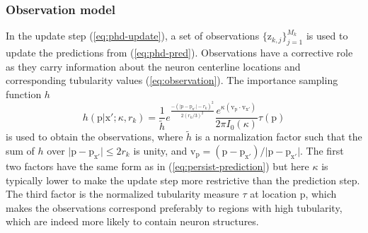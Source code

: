 \subsubsection{Observation model}
\label{sssec:observation-model}
In the update step (\ref{eq:phd-update}), a set of observations $\{\mathrm{z}_{k,j}\}_{j=1}^{M_k}$ is used to update the predictions from (\ref{eq:phd-pred}). Observations have a corrective role as they carry information about the neuron centerline locations and corresponding tubularity values (\ref{eq:observation}). The importance sampling function $h$
\begin{equation}
\label{eq:observation-importance-sampling}
h(\mathrm{p} | \mathrm{x'}; \kappa, r_k) = \frac{1}{\tilde{h}} e^{\frac{ -(\vert \mathrm{p} - \mathrm{p}_{\mathrm{x'}}  \vert - r_k)^2  }{2 (r_k/3)^2}} \frac{e^{\kappa (\mathrm{v}_{\mathrm{p}} \cdot \mathrm{v}_{\mathrm{x'}})}}{2 \pi I_0(\kappa)} \tau(\mathrm{p})
\end{equation}%
is used to obtain the observations, where $\tilde{h}$ is a normalization factor such that the sum of $h$ over $\vert \mathrm{p} - \mathrm{p}_{\mathrm{x'}} \vert \leq 2r_k$ is unity, and $\mathrm{v}_{\mathrm{p}}=(\mathrm{p}-\mathrm{p}_{\mathrm{x'}})/\vert \mathrm{p}-\mathrm{p}_{\mathrm{x'}}\vert$. The first two factors have the same form as in (\ref{eq:persist-prediction}) but here $\kappa$ is typically lower to make the update step more restrictive than the prediction step. The third factor is the normalized tubularity measure $\tau$ \cite{sato1998three} at location $\mathrm{p}$, which makes the observations correspond preferably to regions with high tubularity, which are indeed more likely to contain neuron structures.

